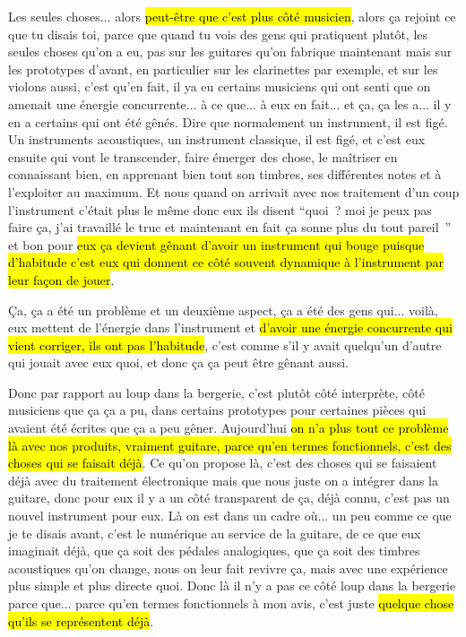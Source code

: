 Les seules choses... alors \hl{peut-être que c'est plus côté musicien}, alors ça rejoint ce que tu disais toi, parce que quand tu vois des gens qui pratiquent plutôt, les seules choses qu'on a eu, pas sur les guitares qu'on fabrique maintenant mais sur les prototypes d'avant, en particulier sur les clarinettes par exemple, et sur les violons aussi, c'est qu'en fait, il ya eu certains musiciens qui ont senti que on amenait une énergie concurrente... à ce que... à eux en fait... et ça, ça les a...  il y en a certains qui ont été gênés. Dire que normalement un instrument, il est figé. Un  instruments acoustiques, un instrument classique, il est figé, et c'est eux ensuite qui vont le transcender, faire émerger des chose, le maîtriser en connaissant bien, en apprenant bien tout son timbres, ses différentes notes et à l'exploiter au maximum. Et nous quand on arrivait avec nos traitement d'un coup l'instrument c'était plus le même donc eux ils disent “quoi ? moi je peux pas faire ça, j'ai travaillé le truc et maintenant en fait ça sonne plus du tout pareil ” et bon pour \hl{eux ça devient gênant d'avoir un instrument qui bouge  puisque d'habitude c'est eux qui donnent ce côté souvent dynamique à l'instrument par leur façon de jouer}. 

Ça, ça a été un problème et un deuxième aspect, ça a été des gens qui... voilà, eux mettent de l'énergie dans l'instrument et \hl{d'avoir une énergie concurrente qui vient corriger, ils ont pas l'habitude}, c'est comme s'il y avait quelqu'un d'autre qui jouait avec eux quoi, et donc ça ça peut être gênant aussi. 

Donc par rapport au loup dans la bergerie, c'est plutôt côté interprète, côté musiciens que ça ça a pu, dans certains prototypes pour certaines pièces qui avaient été écrites que ça a peu gêner. 
Aujourd'hui \hl{on n'a plus tout ce problème là avec nos produits, vraiment guitare, parce qu'en termes fonctionnels, c'est des choses qui se faisait déjà}. Ce qu'on propose là, c'est des choses qui se faisaient déjà avec du traitement électronique mais que nous juste on a intégrer dans la guitare, donc pour eux il y a un côté transparent de ça, déjà connu, c'est pas un nouvel instrument pour eux. Là on est dans un cadre où... un peu comme ce que je te disais avant, c'est le numérique au service de la guitare, de ce que eux imaginait déjà, que ça soit des pédales analogiques, que ça soit des timbres acoustiques qu'on change, nous on leur fait revivre ça, mais avec une expérience plus simple et plus directe quoi. 
Donc là il n'y a pas ce côté loup dans la bergerie parce que... parce qu'en termes fonctionnels à mon avis, c'est juste \hl{quelque chose qu'ils se représentent déjà}. 


